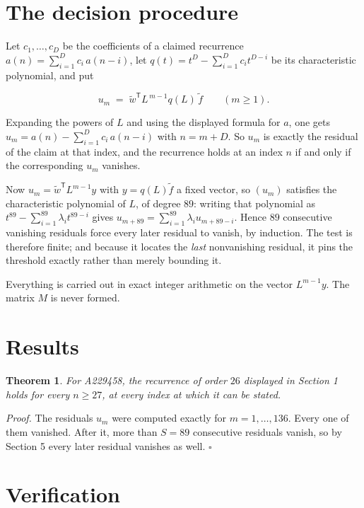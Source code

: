 \documentclass[11pt]{article}
\newtheorem{theorem}{Theorem}
\theoremstyle{definition}
\begin{document}
\section{The decision procedure}

Let $c_1,\dots,c_D$ be the coefficients of a claimed recurrence $a(n) = \sum_{i=1}^{D} c_i\,a(n-i)$, let $q(t) = t^{D} - \sum_{i=1}^{D} c_i t^{D-i}$ be its characteristic polynomial, and put

\[u_m \;=\; \tilde w^{\mathsf T} L^{\,m-1} q(L)\,\tilde f \qquad (m \ge 1).\]

Expanding the powers of $L$ and using the displayed formula for $a$, one gets $u_m = a(n) - \sum_{i=1}^{D} c_i\,a(n-i)$ with $n = m + D$. So $u_m$ is exactly the residual of the claim at that index, and the recurrence holds at an index $n$ if and only if the corresponding $u_m$ vanishes.

Now $u_m = \tilde w^{\mathsf T} L^{m-1} y$ with $y = q(L)\tilde f$ a fixed vector, so $(u_m)$ satisfies the characteristic polynomial of $L$, of degree $89$: writing that polynomial as $t^{89} - \sum_{i=1}^{89} \lambda_i t^{89-i}$ gives $u_{m+89} = \sum_{i=1}^{89} \lambda_i u_{m+89-i}$. Hence $89$ consecutive vanishing residuals force every later residual to vanish, by induction. The test is therefore finite; and because it locates the {\itshape last} nonvanishing residual, it pins the threshold exactly rather than merely bounding it.

Everything is carried out in exact integer arithmetic on the vector $L^{m-1}y$. The matrix $M$ is never formed.

\section{Results}

\begin{theorem} For A229458, the recurrence of order $26$ displayed in Section 1 holds for every $n \ge 27$, at every index at which it can be stated.\end{theorem}

{\itshape Proof.} The residuals $u_m$ were computed exactly for $m = 1,\dots,136$. Every one of them vanished. After it, more than $S = 89$ consecutive residuals vanish, so by Section 5 every later residual vanishes as well. $\square$

\section{Verification}
\end{document}

